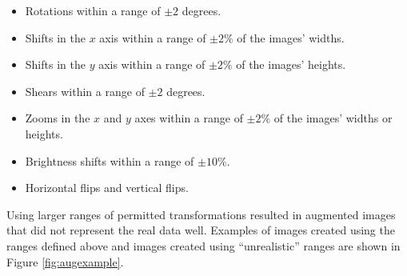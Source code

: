 \begin{itemize}
    \item Rotations within a range of $\pm 2$ degrees.
    \item Shifts in the $x$ axis within a range of $\pm 2\%$ of the images' widths.
    \item Shifts in the $y$ axis within a range of $\pm 2\%$ of the images' heights.
    \item Shears within a range of $\pm 2$ degrees.
    \item Zooms in the $x$ and $y$ axes within a range of $\pm 2\%$ of the images' widths or heights.
    \item Brightness shifts within a range of $\pm 10\%$.
    \item Horizontal flips and vertical flips.
\end{itemize}

Using larger ranges of permitted transformations resulted in augmented images that did not represent the real data well. Examples of images created using the ranges defined above and images created using ``unrealistic'' ranges are shown in Figure \ref{fig:augexample}.

